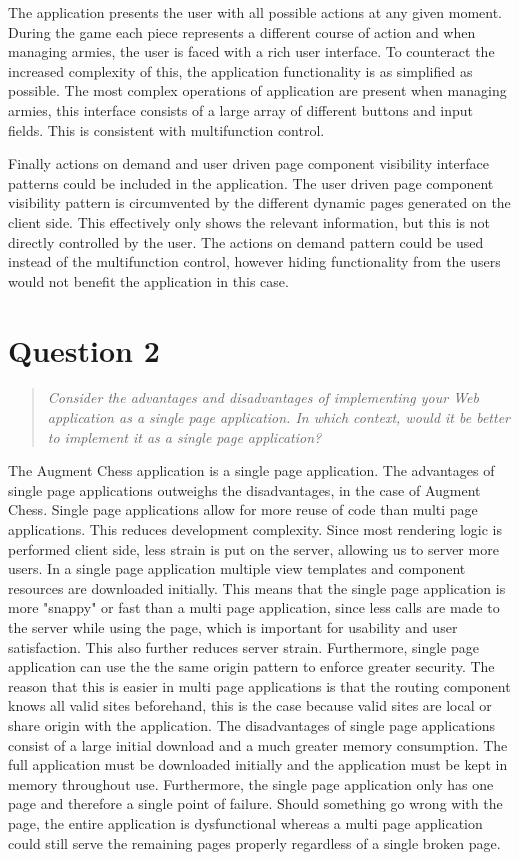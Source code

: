 \documentclass[10pt,a4paper]{report}
\begin{document}
The application presents the user with all possible actions at any given moment. During the game each piece represents a different course of action and when managing armies, the user is faced with a rich user interface. To counteract the increased complexity of this, the application functionality is as simplified as possible. The most complex operations of application are present when managing armies, this interface consists of a large array of different buttons and input fields. This is consistent with multifunction control.


Finally actions on demand and user driven page component visibility interface patterns could be included in the application. The user driven page component visibility pattern is circumvented by the different dynamic pages generated on the client side. This effectively only shows the relevant information, but this is not directly controlled by the user. The actions on demand pattern could be used instead of the multifunction control, however hiding functionality from the users would not benefit the application in this case.
\section{Question 2}
\begin{quote}
\textit{Consider the advantages and disadvantages of implementing your Web application as a single page application. In which context, would it be better to implement it as a single page application?}
\end{quote}

The Augment Chess application is a single page application. The advantages of single page applications outweighs the disadvantages, in the case of Augment Chess. Single page applications allow for more reuse of code than multi page applications. This reduces development complexity.
Since most rendering logic is performed client side, less strain is put on the server, allowing us to server more users. In a single page application multiple view templates and component resources are downloaded initially. This means that the single page application is more "snappy" or fast than a multi page application, since less calls are made to the server while using the page, which is important for usability and user satisfaction. This also further reduces server strain. Furthermore, single page application can use the the same origin pattern to enforce greater security. The reason that this is easier in multi page applications is that the routing component knows all valid sites beforehand, this is the case because valid sites are local or share origin with the application.
The disadvantages of single page applications consist of a large initial download and a much greater memory consumption. The full application must be downloaded initially and the application must be kept in memory throughout use. Furthermore, the single page application only has one page and therefore a single point of failure. Should something go wrong with the page, the entire application is dysfunctional whereas a multi page application could still serve the remaining pages properly regardless of a single broken page.
\end{document}
